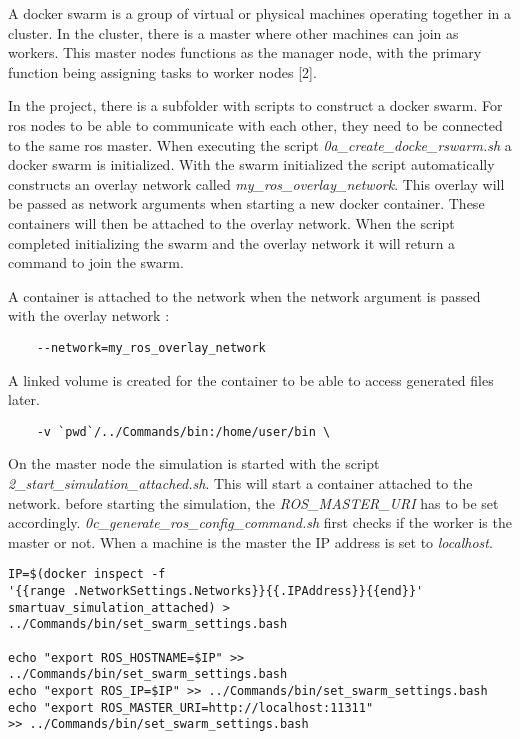 A docker swarm is a group of virtual or physical machines operating together in a cluster.
In the cluster, there is a master where other machines can join as workers. This master
nodes functions as the manager node, with the primary function being assigning tasks to
worker nodes [2].

In the project, there is a subfolder with scripts to construct a docker swarm. For \acs{ros} nodes
to be able to communicate with each other, they need to be connected to the same \acs{ros}
master. When executing the script \textit{0a\_create\_docke\_rswarm.sh} a docker swarm is initialized.
With the swarm initialized the script automatically constructs an overlay network called
\textit{my\_ros\_overlay\_network}. This overlay will be passed as network arguments when starting
a new docker container. These containers will then be attached to the overlay network.
When the script completed initializing the swarm and the overlay network it will return a
command to join the swarm.

A container is attached to the network when the network argument is passed with the
overlay network :

\begin{verbatim}
    --network=my_ros_overlay_network
\end{verbatim}

A linked volume is created for the container to be able to access generated files later.

\begin{verbatim}
    -v `pwd`/../Commands/bin:/home/user/bin \
\end{verbatim}

On the master node the simulation is started with the script \textit{2\_start\_simulation\_attached.sh}. This will 
start a container attached to the network. before starting the simulation, the \textit{ROS\_MASTER\_URI} has to be 
set accordingly. \textit{0c\_generate\_ros\_config\_command.sh} first checks if the worker is the master or not. When 
a machine is the master the IP address is set to \textit{localhost}.

\begin{verbatim}
IP=$(docker inspect -f 
'{{range .NetworkSettings.Networks}}{{.IPAddress}}{{end}}' 
smartuav_simulation_attached) > ../Commands/bin/set_swarm_settings.bash

echo "export ROS_HOSTNAME=$IP" >> ../Commands/bin/set_swarm_settings.bash 
echo "export ROS_IP=$IP" >> ../Commands/bin/set_swarm_settings.bash
echo "export ROS_MASTER_URI=http://localhost:11311" 
>> ../Commands/bin/set_swarm_settings.bash
\end{verbatim}

